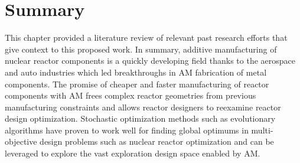 \section{Summary}
This chapter provided a literature review of relevant past research 
efforts that give context to this proposed work.
In summary, additive manufacturing of nuclear reactor components is a quickly 
developing field thanks to the aerospace and auto industries which led breakthroughs 
in \gls{AM} fabrication of metal components. 
The promise of cheaper and faster manufacturing of reactor components with 
\gls{AM} frees complex reactor geometries from previous manufacturing constraints
and allows reactor designers to reexamine reactor design optimization.  
Stochastic optimization methods such as evolutionary algorithms have proven to 
work well for finding global optimums in multi-objective design problems such as 
nuclear reactor optimization and can be leveraged to explore the vast exploration 
design space enabled by \gls{AM}.